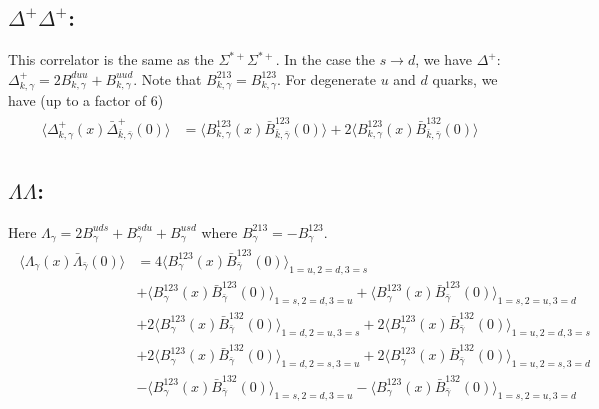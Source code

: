 \documentclass[12pt]{article}
\begin{document}
\subsection{$\Delta^+\Delta^+$:}
This correlator is the same as the $\Sigma^{\ast+}\Sigma^{\ast+}$. In the
case the $s\rightarrow d$, we have $\Delta^+$: 
$\Delta^{+}_{k,\gamma} = 2 B^{duu}_{k,\gamma} + B^{uud}_{k,\gamma}$. 
Note that $B^{213}_{k,\gamma}=B^{123}_{k,\gamma}$. For degenerate $u$ and $d$ quarks,
we have (up to a factor of 6)
%
\begin{gather*}
\begin{split}
\langle \Delta^{+}_{k,\gamma}(x) \bar{\Delta}^{+}_{\bar{k},\bar{\gamma}}(0)\rangle
 &=  \langle B^{123}_{k,\gamma}(x) \bar{B}^{123}_{\bar{k},\bar{\gamma}}(0)\rangle
  + 2\langle B^{123}_{k,\gamma}(x) \bar{B}^{132}_{\bar{k},\bar{\gamma}}(0)\rangle
\end{split}
\end{gather*}


\subsection{$\Lambda\Lambda$:}
Here
$\Lambda_{\gamma} = 2 B^{uds}_{\gamma} + B^{sdu}_{\gamma} + B^{usd}_\gamma$ 
where $B^{213}_{\gamma}=-B^{123}_{\gamma}$.
%
\begin{gather*}
\begin{split}
\langle \Lambda_{\gamma}(x) \bar{\Lambda}_{\bar{\gamma}}(0)\rangle
 &= 4\langle B^{123}_{\gamma}(x) \bar{B}^{123}_{\bar{\gamma}}(0)\rangle_{1=u,2=d,3=s}\\
 &+  \langle B^{123}_{\gamma}(x) \bar{B}^{123}_{\bar{\gamma}}(0)\rangle_{1=s,2=d,3=u}
  +  \langle B^{123}_{\gamma}(x) \bar{B}^{123}_{\bar{\gamma}}(0)\rangle_{1=s,2=u,3=d}\\
 &+ 2\langle B^{123}_{\gamma}(x) \bar{B}^{132}_{\bar{\gamma}}(0)\rangle_{1=d,2=u,3=s}
  + 2\langle B^{123}_{\gamma}(x) \bar{B}^{132}_{\bar{\gamma}}(0)\rangle_{1=u,2=d,3=s}\\
 &+ 2\langle B^{123}_{\gamma}(x) \bar{B}^{132}_{\bar{\gamma}}(0)\rangle_{1=d,2=s,3=u}
  + 2\langle B^{123}_{\gamma}(x) \bar{B}^{132}_{\bar{\gamma}}(0)\rangle_{1=u,2=s,3=d}\\
 &-  \langle B^{123}_{\gamma}(x) \bar{B}^{132}_{\bar{\gamma}}(0)\rangle_{1=s,2=d,3=u}
  -  \langle B^{123}_{\gamma}(x) \bar{B}^{132}_{\bar{\gamma}}(0)\rangle_{1=s,2=u,3=d}
\end{split}
\end{gather*}
\end{document}
